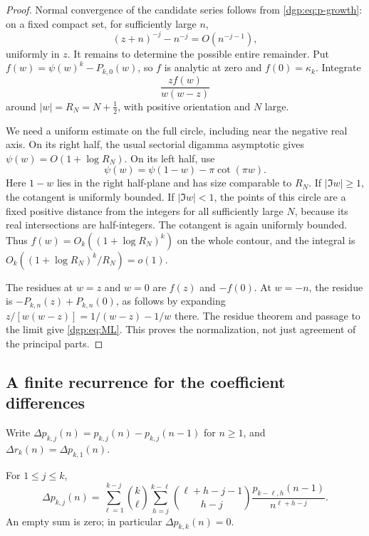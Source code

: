 \begin{proof}
Normal convergence of the candidate series follows from
\eqref{dgp:eq:p-growth}: on a fixed compact set, for sufficiently large $n$,
\[
 (z+n)^{-j}-n^{-j}=O(n^{-j-1}),
\]
uniformly in $z$.  It remains to determine the possible entire
remainder.  Put $f(w)=\psi(w)^k-P_{k,0}(w)$, so $f$ is analytic at
zero and $f(0)=\kappa_k$.  Integrate
\[
                  \frac{zf(w)}{w(w-z)}
\]
around $|w|=R_N=N+\tfrac12$, with positive orientation and $N$ large.

We need a uniform estimate on the full circle, including near the
negative real axis.  On its right half, the usual sectorial digamma
asymptotic gives $\psi(w)=O(1+\log R_N)$.  On its left half, use
\begin{equation}
             \psi(w)=\psi(1-w)-\pi\cot(\pi w).
 \label{dgp:eq:reflection}
\end{equation}
Here $1-w$ lies in the right half-plane and has size comparable to
$R_N$.  If $|\Im w|\ge1$, the cotangent is uniformly bounded.  If
$|\Im w|<1$, the points of this circle are a fixed positive distance
from the integers for all sufficiently large $N$, because its real
intersections are half-integers.  The cotangent is again uniformly
bounded.  Thus $f(w)=O_k((1+\log R_N)^k)$ on the whole contour, and
the integral is $O_k((1+\log R_N)^k/R_N)=o(1)$.

The residues at $w=z$ and $w=0$ are $f(z)$ and $-f(0)$.
At $w=-n$, the residue is
$-P_{k,n}(z)+P_{k,n}(0)$, as follows by expanding
$z/[w(w-z)]=1/(w-z)-1/w$ there.  The residue theorem and passage to
the limit give \eqref{dgp:eq:ML}.  This proves the normalization, not just
agreement of the principal parts.
\end{proof}

\subsection{A finite recurrence for the coefficient differences}

Write $\Delta p_{k,j}(n)=p_{k,j}(n)-p_{k,j}(n-1)$ for $n\ge1$,
and $\Delta r_k(n)=\Delta p_{k,1}(n)$.

\begin{proposition}
\label{dgp:prop:difference}
For $1\le j\le k$,
\begin{equation}
 \Delta p_{k,j}(n)=
 \sum_{\ell=1}^{k-j}\binom{k}{\ell}
 \sum_{h=j}^{k-\ell}
       \binom{\ell+h-j-1}{h-j}
       \frac{p_{k-\ell,h}(n-1)}{n^{\ell+h-j}}.
 \label{dgp:eq:difference}
\end{equation}
An empty sum is zero; in particular $\Delta p_{k,k}(n)=0$.
\end{proposition}

